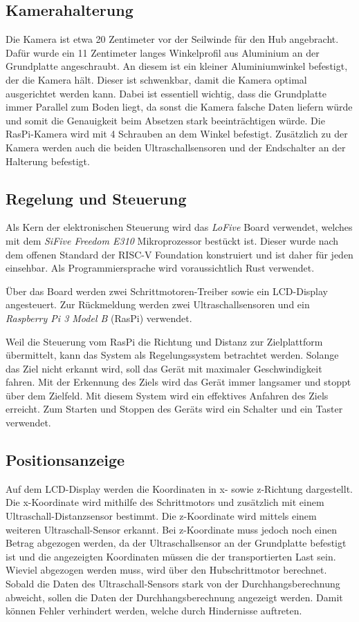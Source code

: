 \documentclass[a4paper]{report}
\begin{document}
\subsection{Kamerahalterung}
Die Kamera ist etwa 20 Zentimeter vor der Seilwinde für den Hub angebracht. Dafür wurde ein 11 Zentimeter langes Winkelprofil aus Aluminium an der Grundplatte angeschraubt. An diesem ist ein kleiner Aluminiumwinkel befestigt, der die Kamera hält. Dieser ist schwenkbar, damit die Kamera optimal ausgerichtet werden kann. Dabei ist essentiell wichtig, dass die Grundplatte immer Parallel zum Boden liegt, da sonst die Kamera falsche Daten liefern würde und somit die Genauigkeit beim Absetzen stark beeinträchtigen würde. Die RasPi-Kamera wird mit 4 Schrauben an dem Winkel befestigt. Zusätzlich zu der Kamera werden auch die beiden Ultraschallsensoren und der Endschalter an der Halterung befestigt.

\subsection{Regelung und Steuerung}
Als Kern der elektronischen Steuerung wird das \textit{LoFive} Board verwendet, welches mit dem \textit{SiFive Freedom E310} Mikroprozessor bestückt ist. Dieser wurde nach dem offenen Standard der RISC-V Foundation konstruiert und ist daher für jeden einsehbar. Als Programmiersprache wird voraussichtlich Rust verwendet.

Über das Board werden zwei Schrittmotoren-Treiber sowie ein LCD-Display angesteuert. Zur Rückmeldung werden zwei Ultraschallsensoren und ein \textit{Raspberry Pi 3 Model B} (RasPi) verwendet.

Weil die Steuerung vom RasPi die Richtung und Distanz zur Zielplattform übermittelt, kann das System als Regelungssystem betrachtet werden. Solange das Ziel nicht erkannt wird, soll das Gerät mit maximaler Geschwindigkeit fahren. Mit der Erkennung des Ziels wird das Gerät immer langsamer und stoppt über dem Zielfeld. Mit diesem System wird ein effektives Anfahren des Ziels erreicht. Zum Starten und Stoppen des Geräts wird ein Schalter und ein Taster verwendet.

\subsection{Positionsanzeige}

Auf dem LCD-Display werden die Koordinaten in x- sowie z-Richtung dargestellt. Die x-Koordinate wird mithilfe des Schrittmotors und zusätzlich mit einem Ultraschall-Distanzsensor bestimmt. Die z-Koordinate wird mittels einem weiteren Ultraschall-Sensor erkannt. Bei z-Koordinate muss jedoch noch einen Betrag abgezogen werden, da der Ultraschallsensor an der Grundplatte befestigt ist und die angezeigten Koordinaten müssen die der transportierten Last sein. Wieviel abgezogen werden muss, wird über den Hubschrittmotor berechnet. Sobald die Daten des Ultraschall-Sensors stark von der Durchhangsberechnung abweicht, sollen die Daten der Durchhangsberechnung angezeigt werden. Damit können Fehler verhindert werden, welche durch Hindernisse auftreten.
\end{document}
